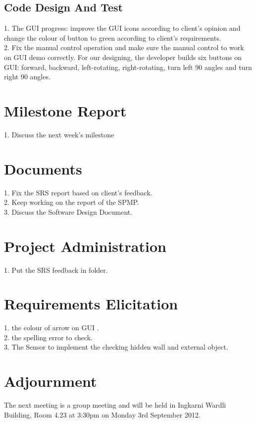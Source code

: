 \documentclass[11pt, a4paper]{article}
\begin{document}
\subsection{Code Design And Test}
1. The GUI progress: improve the GUI icons according to client's opinion and change the colour of button to green according to client's requirements.\\
2. Fix the manual control operation and make sure the manual control to work on GUI demo correctly. For our designing, the developer builds six buttons on GUI: forward, backward, left-rotating, right-rotating, turn left 90 angles and turn right 90 angles. \\

\section{Milestone Report}
1. Discuss the next week's milestone

\section{Documents}
1. Fix the SRS report based on client's feedback.\\
2. Keep working on  the report of the SPMP.\\
3. Discuss the Software Design Document. 


\section{Project Administration}
1. Put the SRS feedback in folder.


\section{Requirements Elicitation}
1. the colour of arrow on GUI .\\
2. the spelling error to check.\\
3. The Sensor to implement the checking hidden wall and external object.\\  

\section{Adjournment}
The next meeting is a group meeting and will be held in Ingkarni Wardli Building, Room 4.23 at 3:30pm on Monday 3rd September 2012.

\vspace*{10pt}
\end{document}
